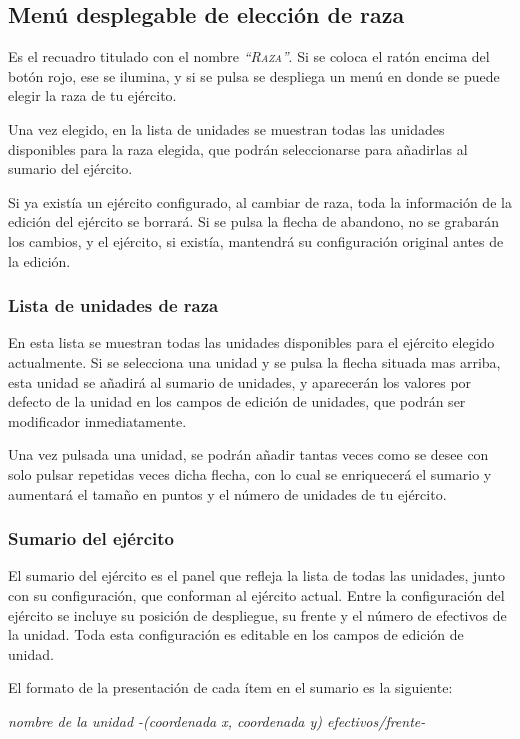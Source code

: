 \subsection*{Menú desplegable de elección de raza}
Es el recuadro titulado con el nombre \textsc{\textit{``Raza''}}. Si
se coloca el ratón encima del botón rojo, ese se ilumina, y si se
pulsa se despliega un menú en donde se puede elegir la raza de tu
ejército.

Una vez elegido, en la lista de unidades se muestran todas las
unidades disponibles para la raza elegida, que podrán seleccionarse
para añadirlas al sumario del ejército.

Si ya existía un ejército configurado, al cambiar de raza, toda la
información de la edición del ejército se borrará. Si se pulsa la
flecha de abandono, no se grabarán los cambios, y el ejército, si
existía, mantendrá su configuración original antes de la edición.

\subsubsection*{Lista de unidades de raza}
En esta lista se muestran todas las unidades disponibles para el
ejército elegido actualmente. Si se selecciona una unidad y se pulsa
la flecha situada mas arriba, esta unidad se añadirá al sumario de
unidades, y aparecerán los valores por defecto de la unidad en los
campos de edición de unidades, que podrán ser modificador inmediatamente.

Una vez pulsada una unidad, se podrán añadir tantas veces como se
desee con solo pulsar repetidas veces dicha flecha, con lo cual se
enriquecerá el sumario y aumentará el tamaño en puntos y el número de
unidades de tu ejército.

\subsubsection*{Sumario del ejército}
El sumario del ejército es el panel que refleja la lista de todas las
unidades, junto con su configuración, que conforman al ejército
actual. Entre la configuración del ejército se incluye su posición de
despliegue, su frente y el número de efectivos de la unidad. Toda esta
configuración es editable en los campos de edición de unidad.

El formato de la presentación de cada ítem en el sumario es la
siguiente:

\begin{center}
\textit{nombre de la unidad -(coordenada x, coordenada y) efectivos/frente-}
\end{center}

